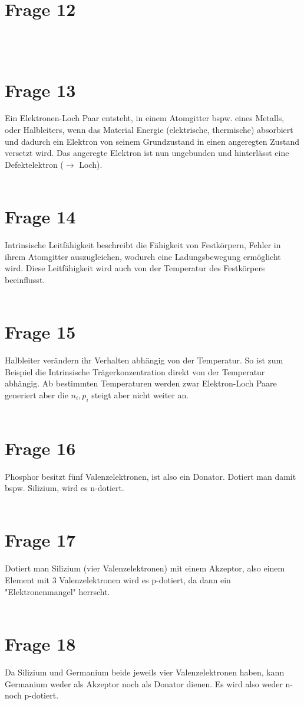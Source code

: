 \documentclass[a4paper]{scrartcl}
\begin{document}
\section*{Frage 12}

~\\
~\\
\section*{Frage 13}
Ein Elektronen-Loch Paar entsteht, in einem Atomgitter bspw. eines Metalls, oder Halbleiters, wenn das Material Energie (elektrische, thermische) absorbiert und dadurch ein Elektron von seinem Grundzustand in einen angeregten Zustand versetzt wird. Das angeregte Elektron ist nun ungebunden und hinterlässt eine Defektelektron ($\rightarrow$ Loch).
~\\
~\\
\section*{Frage 14}
Intrinsische Leitfähigkeit beschreibt die Fähigkeit von Festkörpern, Fehler in ihrem Atomgitter auszugleichen, wodurch eine Ladungsbewegung ermöglicht wird. Diese Leitfähigkeit wird auch von der Temperatur des Festkörpers beeinflusst.
~\\
~\\
\section*{Frage 15}
Halbleiter verändern ihr Verhalten abhängig von der Temperatur. So ist zum Beispiel die Intrinsische Trägerkonzentration direkt von der Temperatur abhängig. Ab bestimmten Temperaturen werden zwar Elektron-Loch Paare generiert aber die $n_i, p_i$ steigt aber nicht weiter an.
~\\
~\\
\section*{Frage 16}
Phosphor besitzt fünf Valenzelektronen, ist also ein Donator. Dotiert man damit bspw. Silizium, wird es n-dotiert.
~\\
~\\
\section*{Frage 17}
Dotiert man Silizium (vier Valenzelektronen) mit einem Akzeptor, also einem Element mit 3 Valenzelektronen wird es p-dotiert, da dann ein "Elektronenmangel" herrscht.
~\\
~\\
\section*{Frage 18}
Da Silizium und Germanium beide jeweils vier Valenzelektronen haben, kann Germanium weder als Akzeptor noch als Donator dienen. Es wird also weder n- noch p-dotiert.
~\\
~\\
\end{document}

